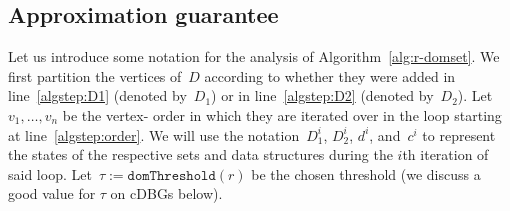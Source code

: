 \subsection{Approximation guarantee}\label{app:threshold}

Let us introduce some notation for the analysis of
Algorithm~\ref{alg:r-domset}. We first partition the vertices of~$D$ according
to whether they were added in line~\ref{algstep:D1} (denoted by~$D_1$) or in
line~\ref{algstep:D2} (denoted by~$D_2$). Let~$v_1,\ldots,v_n$ be the vertex-
order in which they are iterated over in the loop starting at
line~\ref{algstep:order}. We will use the notation~$D_1^i$, $D_2^i$, $d^i$,
and~$c^i$ to represent the states of the respective sets and data structures
during the $i$th iteration of said loop. Let~$\tau :=
\texttt{domThreshold}(r)$ be the chosen threshold (we discuss a good value
for $\tau$ on cDBGs below).

